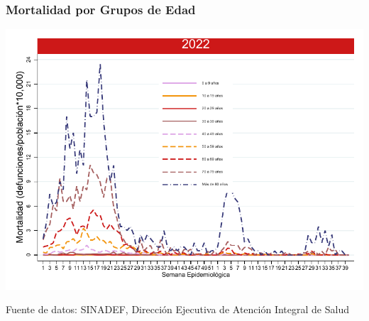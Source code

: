 \documentclass[xcolor=table]{beamer}
\begin{document}
\begin{frame}
	\frametitle{Mortalidad por Grupos de Edad}
	\vspace{-.1cm}
	\begin{center}
		\includegraphics[width=0.9\linewidth]{../figuras/mortalidad_edad_2021_2022.pdf}
	\end{center}
	{\tiny Fuente de datos: SINADEF, Dirección Ejecutiva de Atención Integral de Salud} 
\end{frame}
\end{document}
